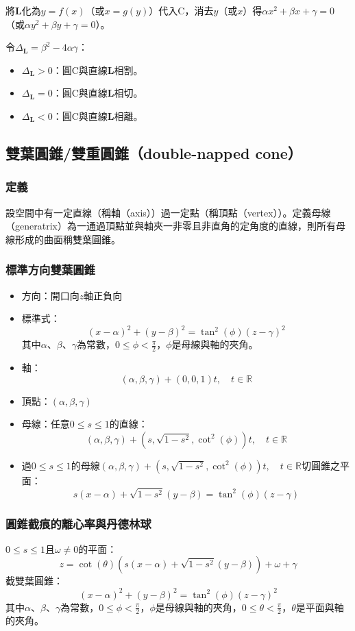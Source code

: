 \documentclass[a4paper,12pt]{article}
\begin{document}
將$\mathbf{L}$化為$y=f(x)$（或$x=g(y)$）代入$\mathrm{C}$，消去$y$（或$x$）得$\alpha x^2+\beta x+\gamma=0$（或$\alpha y^2+\beta y+\gamma=0$）。

令$\Delta_\mathbf{L}=\beta^2-4\alpha\gamma$：
\begin{itemize}
\item $\Delta_\mathbf{L}>0$：圓$\mathrm{C}$與直線$\mathbf{L}$相割。
\item $\Delta_\mathbf{L}=0$：圓$\mathrm{C}$與直線$\displaystyle\mathbf{L}$相切。
\item $\Delta_\mathbf{L}<0$：圓$\mathrm{C}$與直線$\mathbf{L}$相離。
\end{itemize}
\subsection{雙葉圓錐/雙重圓錐（double-napped cone）}
\subsubsection{定義}
設空間中有一定直線（稱軸（axis））過一定點（稱頂點（vertex））。定義母線（generatrix）為一通過頂點並與軸夾一非零且非直角的定角度的直線，則所有母線形成的曲面稱雙葉圓錐。
\subsubsection{標準方向雙葉圓錐}
\begin{itemize}
\item 方向：開口向$z$軸正負向
\item 標準式：
\[(x-\alpha)^2+(y-\beta)^2=\tan^2(\phi)(z-\gamma)^2\]
其中$\alpha$、$\beta$、$\gamma$為常數，$0\leq\phi<\frac{\pi}{2}$，$\phi$是母線與軸的夾角。
\item 軸：
\[(\alpha,\beta,\gamma)+(0,0,1)t,\quad t\in\mathbb{R}\]
\item 頂點：$(\alpha,\beta,\gamma)$
\item 母線：任意$0\leq s\leq 1$的直線：
\[(\alpha,\beta,\gamma)+\left(s,\sqrt{1-s^2},\cot^2(\phi)\right)t,\quad t\in\mathbb{R}\]
\item 過$0\leq s\leq 1$的母線$(\alpha,\beta,\gamma)+\left(s,\sqrt{1-s^2},\cot^2(\phi)\right)t,\quad t\in\mathbb{R}$切圓錐之平面：
\[s(x-\alpha)+\sqrt{1-s^2}(y-\beta)=\tan^2(\phi)(z-\gamma)\]
\end{itemize}
\subsubsection{圓錐截痕的離心率與丹德林球}
$0\leq s\leq 1$且$\omega\neq 0$的平面：
\[z=\cot(\theta)\left(s(x-\alpha)+\sqrt{1-s^2}(y-\beta)\right)+\omega+\gamma\]
截雙葉圓錐：
\[(x-\alpha)^2+(y-\beta)^2=\tan^2(\phi)(z-\gamma)^2\]
其中$\alpha$、$\beta$、$\gamma$為常數，$0\leq\phi<\frac{\pi}{2}$，$\phi$是母線與軸的夾角，$0\leq\theta<\frac{\pi}{2}$，$\theta$是平面與軸的夾角。
\end{document}
